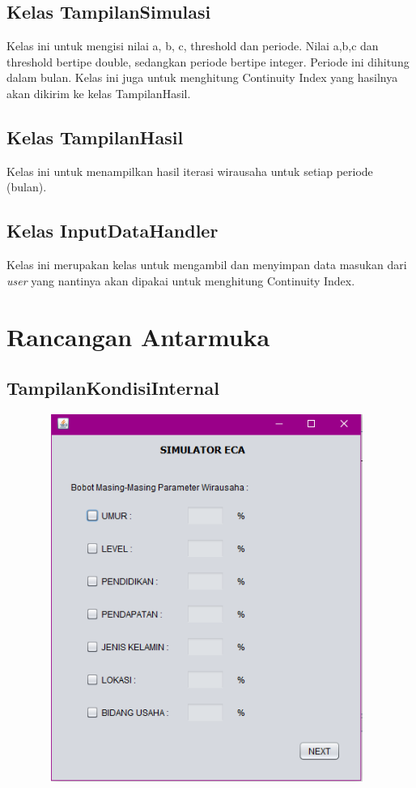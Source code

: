 \subsection{Kelas TampilanSimulasi}
Kelas ini untuk mengisi nilai a, b, c, threshold dan periode. Nilai a,b,c dan threshold bertipe double, sedangkan periode bertipe integer. Periode ini dihitung dalam bulan. Kelas ini juga untuk menghitung Continuity Index yang hasilnya akan dikirim ke kelas TampilanHasil.
\subsection{Kelas TampilanHasil}
Kelas ini untuk menampilkan hasil iterasi wirausaha untuk setiap periode (bulan).
\subsection{Kelas InputDataHandler}
Kelas ini merupakan kelas untuk mengambil dan menyimpan data masukan dari \textit{user} yang nantinya akan dipakai untuk menghitung Continuity Index.


\section{Rancangan Antarmuka}
\label{sec:rancanganantarmuka}

\subsection{TampilanKondisiInternal}

\begin{figure} [H]
	\centering  
	\includegraphics[width=11cm, height=12cm]{tampilanKondisiInternal} 
	\label{fig:kondisiInternal} 
\end{figure}

